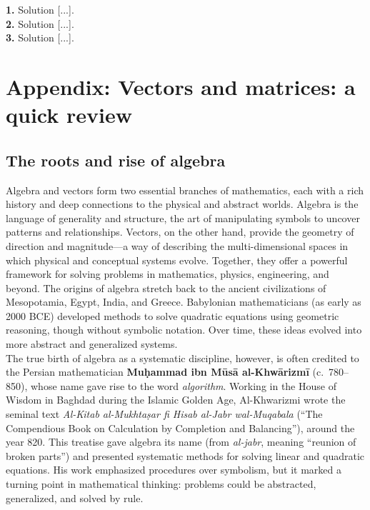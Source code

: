 \documentclass{book}
\begin{document}
\textbf{1.} Solution [...].\\

\textbf{2.} Solution [...].\\

\textbf{3.} Solution [...].\\



\appendix



\chapter{Appendix: Vectors and matrices: a quick review}

\section{The roots and rise of algebra}

Algebra and vectors form two essential branches of mathematics, each with a rich history and deep connections to the physical and abstract worlds. Algebra is the language of generality and structure, the art of manipulating symbols to uncover patterns and relationships. Vectors, on the other hand, provide the geometry of direction and magnitude---a way of describing the multi-dimensional spaces in which physical and conceptual systems evolve. Together, they offer a powerful framework for solving problems in mathematics, physics, engineering, and beyond. The origins of algebra stretch back to the ancient civilizations of Mesopotamia, Egypt, India, and Greece. Babylonian mathematicians (as early as 2000 BCE) developed methods to solve quadratic equations using geometric reasoning, though without symbolic notation. Over time, these ideas evolved into more abstract and generalized systems.\\

The true birth of algebra as a systematic discipline, however, is often credited to the Persian mathematician \textbf{Muḥammad ibn Mūsā al-Khwārizmī} (c.~780--850), whose name gave rise to the word \emph{algorithm}. Working in the House of Wisdom in Baghdad during the Islamic Golden Age, Al-Khwarizmi wrote the seminal text \emph{Al-Kitab al-Mukhtaṣar fi Hisab al-Jabr wal-Muqabala} (``The Compendious Book on Calculation by Completion and Balancing''), around the year 820. This treatise gave algebra its name (from \emph{al-jabr}, meaning ``reunion of broken parts'') and presented systematic methods for solving linear and quadratic equations. His work emphasized procedures over symbolism, but it marked a turning point in mathematical thinking: problems could be abstracted, generalized, and solved by rule.
\end{document}
